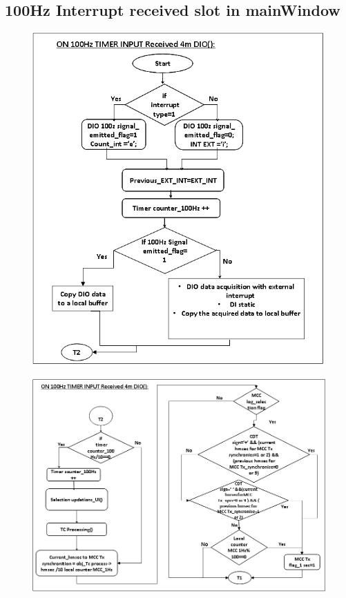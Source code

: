 \subsection{100Hz Interrupt received slot in mainWindow}
\begin{figure}[H]
	\centering
	\includegraphics[width=\linewidth]{./FlowCharts/PngFlowCharts/SLOT_100Hz1.png} 
\end{figure}
\begin{figure}[H]
	\centering
	\includegraphics[width=\linewidth]{./FlowCharts/PngFlowCharts/SLOT_100Hz11.png} 
\end{figure}
